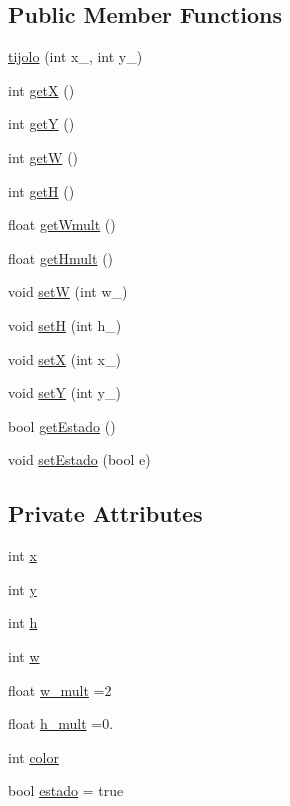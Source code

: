 \subsection*{Public Member Functions}
\begin{DoxyCompactItemize}
\item 
\hyperlink{classtijolo_a1575297d58f55111b16bfde06d7fcf14}{tijolo} (int x\+\_\+, int y\+\_\+)
\item 
int \hyperlink{classtijolo_ab3179398dd6fe44db34eb23556ccd029}{getX} ()
\item 
int \hyperlink{classtijolo_ad5d4edc964d42505990ab3c0e739f175}{getY} ()
\item 
int \hyperlink{classtijolo_a940e6fd9de3320009415b3ee5d9a89ea}{getW} ()
\item 
int \hyperlink{classtijolo_ad742e39614eec9ad0ac8d1e386fee696}{getH} ()
\item 
float \hyperlink{classtijolo_acb8367de6befb88b131e3cb8dd4be70f}{get\+Wmult} ()
\item 
float \hyperlink{classtijolo_ac3b530ef0293d8d5973fa2087c7ea9b9}{get\+Hmult} ()
\item 
void \hyperlink{classtijolo_a6f5eed3413774d0e4d9ee7505a0a68e3}{setW} (int w\+\_\+)
\item 
void \hyperlink{classtijolo_ac15a68731bbf0019493a54ab0bccb04d}{setH} (int h\+\_\+)
\item 
void \hyperlink{classtijolo_afce75411c77a0f53037c33e7a3321d4b}{setX} (int x\+\_\+)
\item 
void \hyperlink{classtijolo_ac1d41f557b4d2170dc4fd4ff53a78c13}{setY} (int y\+\_\+)
\item 
bool \hyperlink{classtijolo_af6e00b828fd202013061749b8d9feb0a}{get\+Estado} ()
\item 
void \hyperlink{classtijolo_a5717441b04b2f156ba2b10068ba8c21a}{set\+Estado} (bool e)
\end{DoxyCompactItemize}
\subsection*{Private Attributes}
\begin{DoxyCompactItemize}
\item 
int \hyperlink{classtijolo_acd39a70440853d5f019378ab501fb688}{x}
\item 
int \hyperlink{classtijolo_a3089987dab8db697303f88bd59c0989f}{y}
\item 
int \hyperlink{classtijolo_ad96e30c66b061844a9a3f3b60d4bfcf2}{h}
\item 
int \hyperlink{classtijolo_a11e0c9ba0ab09baad2622ba49de44f8a}{w}
\item 
float \hyperlink{classtijolo_a541d86c88882bb3be2199b10f840777c}{w\+\_\+mult} =2
\item 
float \hyperlink{classtijolo_a4c6684dc3837ed50b9111ccbd4e95d23}{h\+\_\+mult} =0.
\item 
int \hyperlink{classtijolo_aad4f2b8b44ee1df886b58a60b7a9f653}{color}
\item 
bool \hyperlink{classtijolo_a8515a66460d4a87e5f53903559b6a481}{estado} = true
\end{DoxyCompactItemize}


